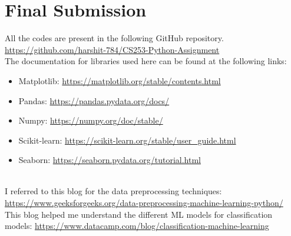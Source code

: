 \documentclass{article}
\begin{document}
\section{Final Submission}
All the codes are present in the following GitHub repository.\\ \url{https://github.com/harshit-784/CS253-Python-Assignment}\\

The documentation for libraries used here can be found at the following links:
\begin{itemize}
    \item Matplotlib: \url{https://matplotlib.org/stable/contents.html}
    \item Pandas: \url{https://pandas.pydata.org/docs/}
    \item Numpy: \url{https://numpy.org/doc/stable/}
    \item Scikit-learn: \url{https://scikit-learn.org/stable/user_guide.html}
    \item Seaborn: \url{https://seaborn.pydata.org/tutorial.html}
\end{itemize}\\

I referred to this blog for the data preprocessing techniques: 
\url{https://www.geeksforgeeks.org/data-preprocessing-machine-learning-python/}\\

This blog helped me understand the different ML models for classification models:
\url{https://www.datacamp.com/blog/classification-machine-learning}




\end{document}
